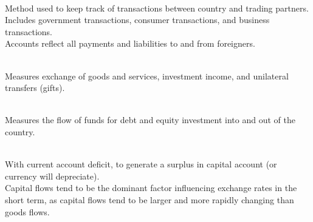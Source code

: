 \begin{definition} \\
Method used to keep track of transactions between country and trading partners.\\
Includes government transactions, consumer transactions, and business transactions.\\
Accounts reflect all payments and liabilities to and from foreigners.
\end{definition}

\begin{definition} \\
Measures exchange of goods and services, investment income, and unilateral transfers (gifts).
\end{definition}

\begin{definition} \\
Measures the flow of funds for debt and equity investment into and out of the country.
\end{definition}

\begin{remark} \\
With current account deficit, to generate a surplus in capital account (or currency will depreciate).\\
Capital flows tend to be the dominant factor influencing exchange rates in the short term, as capital flows tend to be larger and more rapidly changing than goods flows.
\end{remark}

